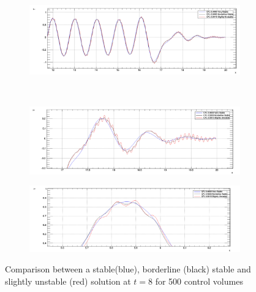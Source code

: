 \documentclass[paper=a4, fontsize=11pt, abstract=on]{scrartcl}
\numberwithin{equation}{section}		%
\numberwithin{figure}{section}			%
\numberwithin{table}{section}				%
\begin{document}
\begin{figure}[H]
        \centering
        \begin{subfigure}[h]{\textwidth}
                \includegraphics[width = 14.95cm]{stab1}
                \caption{}
				
        \end{subfigure}%
       ~~~~~
       
        \begin{subfigure}[h]{\textwidth}
                \includegraphics[width = 15.15cm]{stab3}
                \caption{}
                
        \end{subfigure}
        
        
        \begin{subfigure}[h]{\textwidth}
                \includegraphics[width = 15.35cm]{stab2}
                \caption{}
                
        \end{subfigure}
        \caption{Comparison between a stable(blue), borderline (black) stable and slightly unstable (red) solution at $t=8$ for 500 control volumes}
        \label{q34}
\end{figure}
\end{document}

